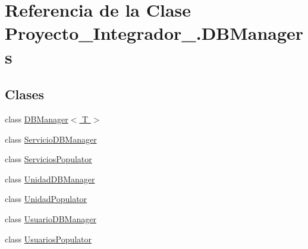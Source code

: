 \hypertarget{class_proyecto___integrador__3_1_1_d_b_managers}{\section{Referencia de la Clase Proyecto\-\_\-\-Integrador\-\_.\-D\-B\-Managers}
\label{class_proyecto___integrador__3_1_1_d_b_managers}
}
\subsection*{Clases}
\begin{DoxyCompactItemize}
\item 
class \hyperlink{class_proyecto___integrador__3_1_1_d_b_managers_1_1_d_b_manager_3_01_t_01_4}{D\-B\-Manager$<$ T $>$}
\item 
class \hyperlink{class_proyecto___integrador__3_1_1_d_b_managers_1_1_servicio_d_b_manager}{Servicio\-D\-B\-Manager}
\item 
class \hyperlink{class_proyecto___integrador__3_1_1_d_b_managers_1_1_servicios_populator}{Servicios\-Populator}
\item 
class \hyperlink{class_proyecto___integrador__3_1_1_d_b_managers_1_1_unidad_d_b_manager}{Unidad\-D\-B\-Manager}
\item 
class \hyperlink{class_proyecto___integrador__3_1_1_d_b_managers_1_1_unidad_populator}{Unidad\-Populator}
\item 
class \hyperlink{class_proyecto___integrador__3_1_1_d_b_managers_1_1_usuario_d_b_manager}{Usuario\-D\-B\-Manager}
\item 
class \hyperlink{class_proyecto___integrador__3_1_1_d_b_managers_1_1_usuarios_populator}{Usuarios\-Populator}
\end{DoxyCompactItemize}
